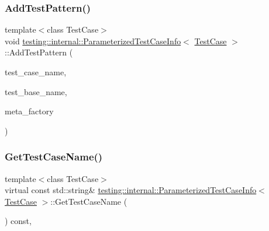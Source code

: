 \mbox{\label{classtesting_1_1internal_1_1_parameterized_test_case_info_a3e557c888ec5e23b138c2ff254db15e5}} 
\subsubsection{\texorpdfstring{AddTestPattern()}{AddTestPattern()}}
{\footnotesize\ttfamily template$<$class Test\+Case$>$ \\
void \mbox{\hyperlink{classtesting_1_1internal_1_1_parameterized_test_case_info}{testing\+::internal\+::\+Parameterized\+Test\+Case\+Info}}$<$ \mbox{\hyperlink{classtesting_1_1_test_case}{Test\+Case}} $>$\+::Add\+Test\+Pattern (\begin{DoxyParamCaption}\item[{const char $\ast$}]{test\+\_\+case\+\_\+name,  }\item[{const char $\ast$}]{test\+\_\+base\+\_\+name,  }\item[{\mbox{\hyperlink{classtesting_1_1internal_1_1_test_meta_factory_base}{Test\+Meta\+Factory\+Base}}$<$ \mbox{\hyperlink{classtesting_1_1internal_1_1_parameterized_test_case_info_a643a87e178bf92a4246ce21054e44b96}{Param\+Type}} $>$ $\ast$}]{meta\+\_\+factory }\end{DoxyParamCaption})\hspace{0.3cm}{\ttfamily [inline]}}

\mbox{\label{classtesting_1_1internal_1_1_parameterized_test_case_info_a8a9eafc7654b154165f131974397e200}} 
\subsubsection{\texorpdfstring{GetTestCaseName()}{GetTestCaseName()}}
{\footnotesize\ttfamily template$<$class Test\+Case$>$ \\
virtual const std\+::string\& \mbox{\hyperlink{classtesting_1_1internal_1_1_parameterized_test_case_info}{testing\+::internal\+::\+Parameterized\+Test\+Case\+Info}}$<$ \mbox{\hyperlink{classtesting_1_1_test_case}{Test\+Case}} $>$\+::Get\+Test\+Case\+Name (\begin{DoxyParamCaption}{ }\end{DoxyParamCaption}) const\hspace{0.3cm}{\ttfamily [inline]}, {\ttfamily [virtual]}}



